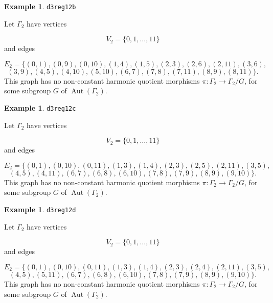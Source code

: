 \documentclass[12pt,letterpaper]{article}
\theoremstyle{definition}
\newtheorem{example}[theorem]{Example}
\DeclareMathOperator{\Aut}{Aut}
\begin{document}
\begin{example}%
\label{example:d3reg12b}
  {\tt d3reg12b}\newline
{\rm  
Let $\Gamma_2$ have vertices

\[
V_2=\{0,1,\dots,11\}
\]
and edges

\[
E_2 = \{
(0, 1), (0, 9), (0, 10), (1, 4), (1, 5), (2, 3), (2, 6),
(2, 11), (3, 6),
\]
\[
(3, 9), (4, 5), (4, 10), (5, 10), (6, 7), (7, 8), (7, 11), (8,
9), (8, 11)
\}.
\]
This graph has no non-constant harmonic quotient
morphisms $\pi: \Gamma_2\to \Gamma_2/G$, for some subgroup
$G$ of $\Aut(\Gamma_2)$.

}
\end{example}



\begin{example}%
\label{example:d3reg12c}
  {\tt d3reg12c}\newline
{\rm  
Let $\Gamma_2$ have vertices

\[
V_2=\{0,1,\dots,11\}
\]
and edges

\[
E_2 = \{
(0, 1), (0, 10), (0, 11), (1, 3), (1, 4), (2, 3), (2, 5),
(2, 11), (3, 5),
\]
\[
(4, 5), (4, 11), (6, 7), (6, 8), (6, 10), (7, 8), (7, 9), (8, 9), (9, 10)
\}.
\]
This graph has no non-constant harmonic quotient
morphisms $\pi: \Gamma_2\to \Gamma_2/G$, for some subgroup
$G$ of $\Aut(\Gamma_2)$.

}
\end{example}



\begin{example}%
\label{example:d3reg12d}
  {\tt d3reg12d}\newline
{\rm  
Let $\Gamma_2$ have vertices

\[
V_2=\{0,1,\dots,11\}
\]
and edges

\[
E_2 = \{
(0, 1), (0, 10), (0, 11), (1, 3), (1, 4), (2, 3), (2, 4),
(2, 11), (3, 5),
\]
\[
(4, 5), (5, 11), (6, 7), (6, 8), (6, 10), (7, 8), (7, 9), (8, 9), (9, 10)
\}.
\]
This graph has no non-constant harmonic quotient
morphisms $\pi: \Gamma_2\to \Gamma_2/G$, for some subgroup
$G$ of $\Aut(\Gamma_2)$.

}
\end{example}
\end{document}
